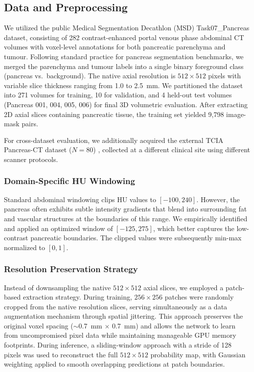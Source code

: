 \documentclass[review,authoryear]{elsarticle}
\begin{document}
\subsection{Data and Preprocessing}
We utilized the public Medical Segmentation Decathlon (MSD) Task07\_Pancreas dataset, consisting of 282 contrast-enhanced portal venous phase abdominal CT volumes with voxel-level annotations for both pancreatic parenchyma and tumour. Following standard practice for pancreas segmentation benchmarks, we merged the parenchyma and tumour labels into a single binary foreground class (pancreas vs.\ background). The native axial resolution is $512 \times 512$ pixels with variable slice thickness ranging from 1.0 to 2.5~mm. We partitioned the dataset into 271 volumes for training, 10 for validation, and 4 held-out test volumes (Pancreas 001, 004, 005, 006) for final 3D volumetric evaluation. After extracting 2D axial slices containing pancreatic tissue, the training set yielded 9,798 image-mask pairs.

For cross-dataset evaluation, we additionally acquired the external TCIA Pancreas-CT dataset ($N=80$) \cite{tcia}, collected at a different clinical site using different scanner protocols.

\subsubsection{Domain-Specific HU Windowing}
Standard abdominal windowing clips HU values to $[-100, 240]$. However, the pancreas often exhibits subtle intensity gradients that blend into surrounding fat and vascular structures at the boundaries of this range. We empirically identified and applied an optimized window of $[-125, 275]$, which better captures the low-contrast pancreatic boundaries. The clipped values were subsequently min-max normalized to $[0, 1]$.

\subsubsection{Resolution Preservation Strategy}
Instead of downsampling the native $512 \times 512$ axial slices, we employed a patch-based extraction strategy. During training, $256 \times 256$ patches were randomly cropped from the native resolution slices, serving simultaneously as a data augmentation mechanism through spatial jittering. This approach preserves the original voxel spacing ($\sim$0.7~mm $\times$ 0.7~mm) and allows the network to learn from uncompromised pixel data while maintaining manageable GPU memory footprints. During inference, a sliding-window approach with a stride of 128 pixels was used to reconstruct the full $512 \times 512$ probability map, with Gaussian weighting applied to smooth overlapping predictions at patch boundaries.
\end{document}
